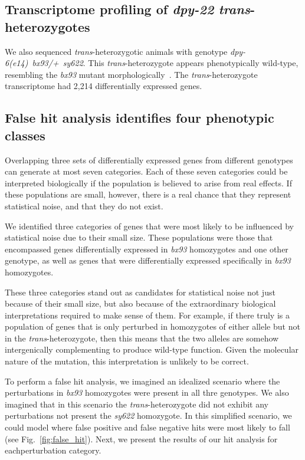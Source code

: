 \documentclass[10pt, twocolumn]{article}
\newcommand{\gene}[1]{\mbox{\emph{#1}}}
\newcommand{\transn}{2,214}
\begin{document}
\subsection*{Transcriptome profiling of \gene{dpy-22}
             \emph{trans}-heterozygotes}
We also sequenced \emph{trans}-heterozygotic animals with genotype
\gene{dpy-6(e14) bx93/+ sy622}. This \emph{trans}-heterozygote appears
phenotypically wild-type, resembling the \emph{bx93} mutant
morphologically~\cite{Moghal2003}. The \emph{trans}-heterozygote transcriptome
had \transn{} differentially expressed genes.

\subsection{False hit analysis identifies four phenotypic classes}
Overlapping three sets of differentially expressed genes from different
genotypes can generate at most seven categories. Each of these seven categories
could be interpreted biologically if the population is believed to arise from
real effects. If these populations are small, however, there is a real chance
that they represent statistical noise, and that they do not exist.

We identified three categories of genes that were most likely to be influenced
by statistical noise due to their small size. These populations were those that
encompassed genes differentially expressed in  \emph{bx93} homozygotes and one
other genotype, as well as genes that were differentially expressed specifically
in \emph{bx93} homozygotes.

These three categories stand out as candidates for statistical noise not just
because of their small size, but also because of the extraordinary biological
interpretations required to make sense of them. For example, if there truly is
a population of genes that is only perturbed in homozygotes of either allele but
not in the \emph{trans}-heterozygote, then this means that the two alleles are
somehow intergenically complementing to produce wild-type function. Given the
molecular nature of the mutation, this interpretation is unlikely to be correct.

To perform a false hit analysis, we imagined an idealized scenario where the
perturbations in \emph{bx93} homozygotes were present in all thre genotypes. We
also imagined that in this scenario the \emph{trans}-heterozygote did not exhibit
any perturbations not present the \emph{sy622} homozygote. In this simplified
scenario, we could model where false positive and false negative hits were most
likely to fall (see Fig.~\ref{fig:false_hit}). Next, we present the results of
our hit analysis for eachperturbation category.
\end{document}
